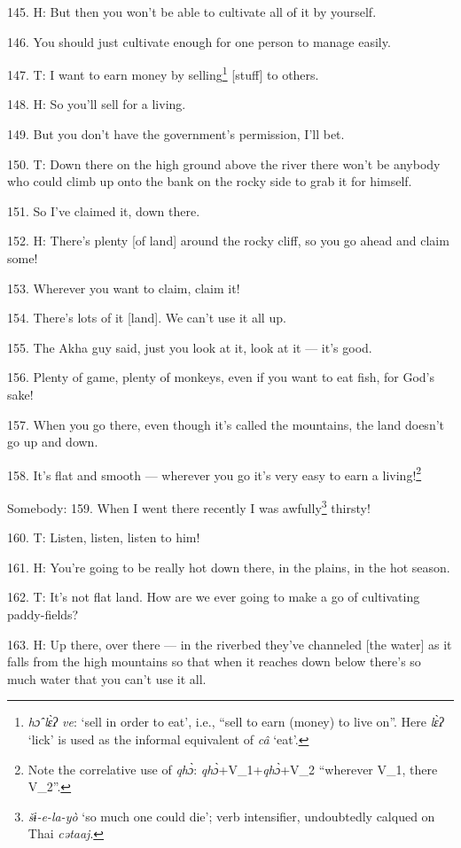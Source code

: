 145. H: But then you won't be able to cultivate all of it by yourself.

146. You should just cultivate enough for one person to manage easily.

147. T: I want to earn money by selling\footnote{\textit{hɔ̂ lɛ̀ʔ ve}: `sell in order to eat', i.e., ``sell to earn (money) to live on''. Here \textit{lɛ̀ʔ} `lick' is used as the informal equivalent of \textit{câ} `eat'.} [stuff] to others.

148. H: So you'll sell for a living.

149. But you don't have the government's permission, I'll bet.

150. T: Down there on the high ground above the river there won't be anybody who
could climb up onto the bank on the rocky side to grab it for himself.

151. So I've claimed it, down there.

152. H: There's plenty [of land] around the rocky cliff, so you go ahead and claim
some!

153. Wherever you want to claim, claim it!

154. There's lots of it [land]. We can't use it all up.

155. The Akha guy said, just you look at it, look at it --- it's good.

156. Plenty of game, plenty of monkeys, even if you want to eat fish, for God's
sake!

157. When you go there, even though it's called the mountains, the land doesn't
go up and down.

158. It's flat and smooth --- wherever you go it's very easy to earn a living!\footnote{Note the correlative use of \textit{qhɔ̀}: \textit{qhɔ̀}+V\_1+\textit{qhɔ̀}+V\_2 ``wherever V\_1, there V\_2''.}

Somebody: 159. When I went there recently I was awfully\footnote{\textit{šɨ-e-la-yò} `so much one could die'; verb intensifier, undoubtedly calqued on Thai \textit{cətaaj}.} thirsty!

160. T: Listen, listen, listen to him!

161. H: You're going to be really hot down there, in the plains, in the hot season.

162. T: It's not flat land. How are we ever going to make a go of cultivating paddy-fields?

163. H: Up there, over there --- in the riverbed they've channeled [the water]
as it falls from the high mountains so that when it reaches down below there's
so much water that you can't use it all.

